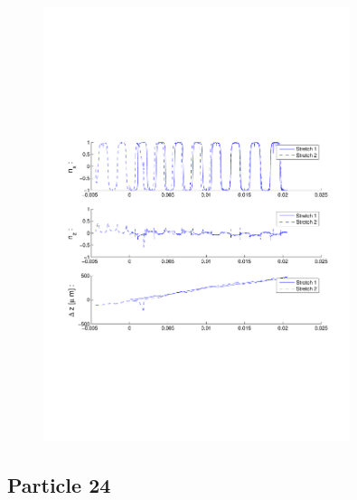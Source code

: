 \begin{figure}[ H]

\centering

\includegraphics[width=0.8\textwidth]{Images/Particle 20/Stretch1.pdf}

\end{figure}



\subsection{Particle 24}

